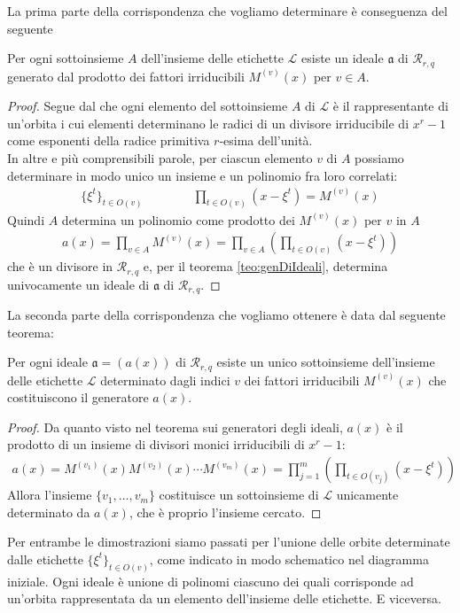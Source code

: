 \vspace{0.6cm}

\noindent
La prima parte della corrispondenza che vogliamo determinare è conseguenza del seguente
\begin{teorema}\label{teo:corrispEtiIde1}
   Per ogni sottoinsieme $A$ dell'insieme delle etichette $\mathscr{L}$ esiste un ideale $\mathfrak{a}$ di $\mathcal{R}_{r,q}$ generato dal prodotto dei fattori irriducibili $M^{(v)}(x)$ per $v\in A$.
\end{teorema}
\begin{proof}
   Segue dal che ogni elemento del sottoinsieme $A$ di $\mathscr{L}$ è il rappresentante di un'orbita i cui elementi determinano le radici di un divisore irriducibile di $x^r - 1$ come esponenti della radice primitiva $r$-esima dell'unità.\\
   In altre e più comprensibili parole, per ciascun elemento $v$ di $A$ possiamo determinare in modo unico un insieme e un polinomio fra loro correlati:
   \begin{align*}
      \lbrace \xi^{t} \rbrace_{t \in O(v)} \qquad \qquad \prod_{t \in O(v)} (x - \xi^{t}) = M^{(v)}(x)
   \end{align*}
   Quindi $A$ determina un polinomio come prodotto dei $M^{(v)}(x)$ per $v$ in $A$
   \begin{align*}
      a(x) = \prod_{v\in A} M^{(v)}(x) = \prod_{v\in A} (  \prod_{t \in O(v)} (x - \xi^{t}) )
   \end{align*}
   che è un divisore in $\mathcal{R}_{r,q} $ e, per il teorema \ref{teo:genDiIdeali}, determina univocamente un ideale di $\mathfrak{a}$ di $\mathcal{R}_{r,q}$.
\end{proof}
\noindent
La seconda parte della corrispondenza che vogliamo ottenere è data dal seguente teorema:
\begin{teorema}\label{teo:corrispEtiIde2}
   Per ogni ideale $\mathfrak{a} = (a(x))$ di $\mathcal{R}_{r,q}$ esiste un unico sottoinsieme dell'insieme delle etichette $\mathscr{L}$ determinato dagli indici $v$ dei fattori irriducibili $M^{(v)}(x)$ che costituiscono il generatore $a(x)$.
\end{teorema}
\begin{proof}
   Da quanto visto nel teorema sui generatori degli ideali, $a(x)$ è il prodotto di un insieme di divisori monici irriducibili di $x^r - 1$:
   \begin{align*}
      a(x) =  M^{(v_{1})}(x) M^{(v_{2})}(x) \cdots M^{(v_{m})}(x) = \prod_{j=1}^{m} (  \prod_{t \in O(v_{j})} (x - \xi^{t}) )
   \end{align*}
   Allora l'insieme $ \lbrace v_{1}, \dots , v_{m} \rbrace$ costituisce un sottoinsieme di $\mathscr{L}$ unicamente determinato da $a(x) $, che è proprio l'insieme cercato.
\end{proof}
\noindent
Per entrambe le dimostrazioni siamo passati per l'unione delle orbite determinate dalle etichette $\lbrace \xi^{t} \rbrace_{t \in O(v)}$, come indicato in modo schematico nel diagramma iniziale. Ogni ideale è unione di polinomi ciascuno dei quali corrisponde ad un'orbita rappresentata da un elemento dell'insieme delle etichette. E viceversa.

